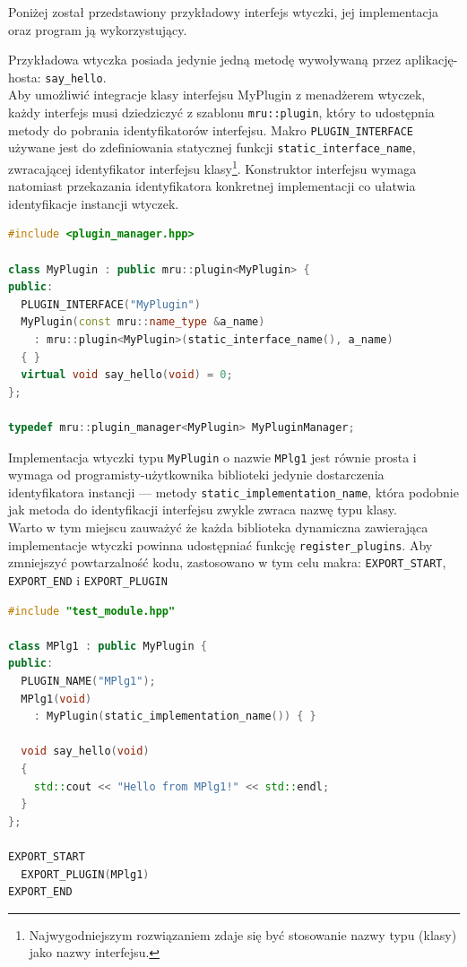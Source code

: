 \par
Poniżej został przedstawiony przykładowy interfejs wtyczki, jej implementacja oraz program ją wykorzystujący.

\par
Przykładowa wtyczka posiada jedynie jedną metodę wywoływaną przez aplikację-hosta: \texttt{say\_hello}.\\
Aby umożliwić integracje klasy interfejsu MyPlugin z menadżerem wtyczek, każdy interfejs musi dziedziczyć z szablonu \texttt{mru::plugin}, który to udostępnia metody do pobrania identyfikatorów interfejsu.
Makro \texttt{PLUGIN\_INTERFACE} używane jest do zdefiniowania statycznej funkcji \texttt{static\_interface\_name}, zwracającej identyfikator interfejsu klasy\footnote{Najwygodniejszym rozwiązaniem zdaje się być stosowanie nazwy typu (klasy) jako nazwy interfejsu.}.
Konstruktor interfejsu wymaga natomiast przekazania identyfikatora konkretnej implementacji co ułatwia identyfikacje instancji wtyczek.
\begin{lstlisting}[caption={ test\_module.hpp}, language=C++]
#include <plugin_manager.hpp>

class MyPlugin : public mru::plugin<MyPlugin> {
public:
  PLUGIN_INTERFACE("MyPlugin")
  MyPlugin(const mru::name_type &a_name)
    : mru::plugin<MyPlugin>(static_interface_name(), a_name)
  { }
  virtual void say_hello(void) = 0;
};

typedef mru::plugin_manager<MyPlugin> MyPluginManager;
\end{lstlisting}

\par
Implementacja wtyczki typu \texttt{MyPlugin} o nazwie \texttt{MPlg1} jest równie prosta i wymaga od programisty-użytkownika biblioteki jedynie dostarczenia identyfikatora instancji --- metody \texttt{static\_implementation\_name}, która podobnie jak metoda do identyfikacji interfejsu zwykle zwraca nazwę typu klasy.\\
Warto w tym miejscu zauważyć że każda biblioteka dynamiczna zawierająca implementacje wtyczki powinna udostępniać funkcję \texttt{register\_plugins}. Aby zmniejszyć powtarzalność kodu, zastosowano w tym celu makra: \texttt{EXPORT\_START}, \texttt{EXPORT\_END} i \texttt{EXPORT\_PLUGIN}
\begin{lstlisting}[caption={ test\_module.cpp}, language=C++]
#include "test_module.hpp"

class MPlg1 : public MyPlugin { 
public:
  PLUGIN_NAME("MPlg1");
  MPlg1(void)
    : MyPlugin(static_implementation_name()) { } 

  void say_hello(void)
  {
    std::cout << "Hello from MPlg1!" << std::endl;
  }
};

EXPORT_START
  EXPORT_PLUGIN(MPlg1)
EXPORT_END

\end{lstlisting}

